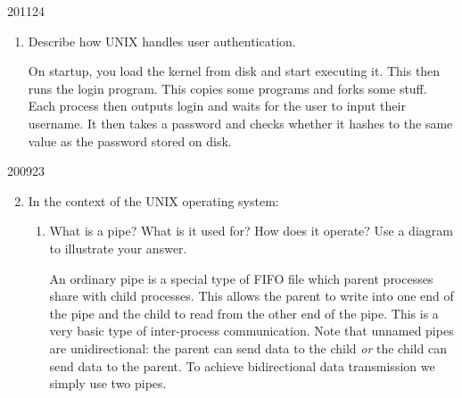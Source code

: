 \documentclass[10pt,\jkfside,a4paper]{article}
\begin{document}
\begin{examquestion}{2011}{2}{4}
\begin{enumerate}
\begin{enumerate}
\end{enumerate}

\item Describe how UNIX handles user authentication.

On startup, you load the kernel from disk and start executing it. This then 
runs the login program. This copies some programs and forks some stuff. Each 
process then outputs login and waits for the user to input their username. 
It then takes a password and checks whether it hashes to the same value as the 
password stored on disk.

\end{enumerate}

\end{examquestion}

\begin{examquestion}{2009}{2}{3}

\begin{enumerate}\setcounter{enumi}{1}

\item In the context of the UNIX operating system:

\begin{enumerate}

\item What is a pipe? What is it used for? How does it operate? Use a diagram
to illustrate your answer.

An ordinary pipe is a special type of FIFO file which parent processes share 
with child processes. This allows the parent to write into one end of the pipe and 
the child to read from the other end of the pipe. This is a very basic type of 
inter-process communication. Note that unnamed pipes are unidirectional: the parent 
can send data to the child \textit{or} the child can send data to the parent. To achieve 
bidirectional data transmission we simply use two pipes.


\end{enumerate}
\end{enumerate}
\end{examquestion}
\end{document}
